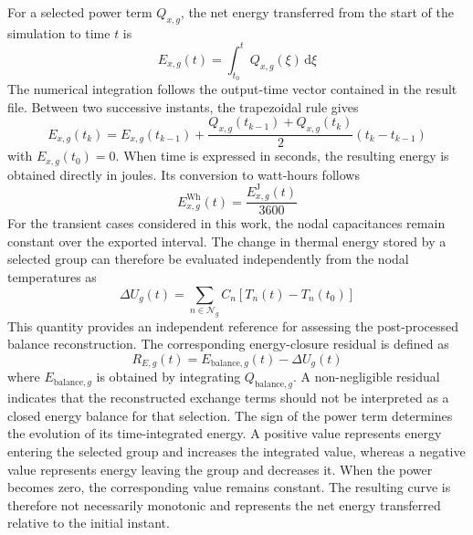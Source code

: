For a selected power term \(Q_{x,g}\), the net energy transferred from the
start of the simulation to time \(t\) is
\begin{equation}
    E_{x,g}(t)
    =
    \int_{t_0}^{t}
    Q_{x,g}(\xi)\,
    \mathrm{d}\xi
    \label{eq:thermal_energy_integral}
\end{equation}
The numerical integration follows the output-time vector contained in the
result file. Between two successive instants, the trapezoidal rule gives
\begin{equation}
    E_{x,g}(t_k)
    =
    E_{x,g}(t_{k-1})
    +
    \frac{
        Q_{x,g}(t_{k-1})
        +
        Q_{x,g}(t_k)
    }{2}
    \left(
        t_k-t_{k-1}
    \right)
    \label{eq:thermal_energy_trapezoidal}
\end{equation}
with \(E_{x,g}(t_0)=0\). When time is expressed in seconds, the resulting
energy is obtained directly in joules. Its conversion to watt-hours follows
\begin{equation}
    E_{x,g}^{\mathrm{Wh}}(t)
    =
    \frac{
        E_{x,g}^{\mathrm{J}}(t)
    }{3600}
    \label{eq:joule_to_watt_hour}
\end{equation}
For the transient cases considered in this work, the nodal capacitances
remain constant over the exported interval. The change in thermal energy
stored by a selected group can therefore be evaluated independently from the
nodal temperatures as
\begin{equation}
    \Delta U_g(t)
    =
    \sum_{n\in\mathcal{N}_g}
    C_n
    \left[
        T_n(t)-T_n(t_0)
    \right]
    \label{eq:stored_thermal_energy_change}
\end{equation}
This quantity provides an independent reference for assessing the
post-processed balance reconstruction. The corresponding energy-closure
residual is defined as
\begin{equation}
    R_{E,g}(t)
    =
    E_{\mathrm{balance},g}(t)
    -
    \Delta U_g(t)
    \label{eq:thermal_energy_closure_residual}
\end{equation}
where \(E_{\mathrm{balance},g}\) is obtained by integrating
\(Q_{\mathrm{balance},g}\). A non-negligible residual indicates that the
reconstructed exchange terms should not be interpreted as a closed energy
balance for that selection.
The sign of the power term determines the evolution of its time-integrated
energy. A positive value represents energy entering the selected group and
increases the integrated value, whereas a negative value represents energy
leaving the group and decreases it. When the power becomes zero, the
corresponding value remains constant. The resulting curve is therefore not
necessarily monotonic and represents the net energy transferred relative to
the initial instant.

